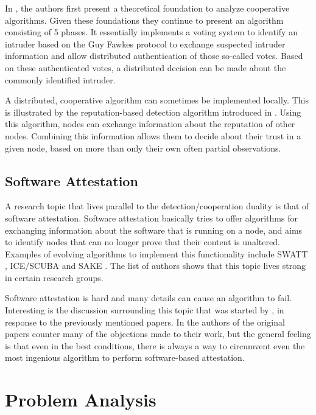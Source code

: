 \documentclass[conference]{IEEEtran}
\begin{document}
In \cite{krontiris2009cooperative}, the authors first present a theoretical
foundation to analyze cooperative algorithms. Given these foundations they
continue to present an algorithm consisting of 5 phases. It essentially
implements a voting system to identify an intruder based on the Guy Fawkes
protocol \cite{anderson1998new} to exchange suspected intruder information and
allow distributed authentication of those so-called votes. Based on these
authenticated votes, a distributed decision can be made about the commonly
identified intruder.

A distributed, cooperative algorithm can sometimes be implemented locally. This
is illustrated by the reputation-based detection algorithm introduced in
\cite{ganeriwal2008reputation}. Using this algorithm, nodes can exchange
information about the reputation of other nodes. Combining this information
allows them to decide about their trust in a given node, based on more than
only their own often partial observations.

\subsection{Software Attestation}
\label{subsection:attestation}

A research topic that lives parallel to the detection/cooperation duality is
that of software attestation. Software attestation basically tries to offer
algorithms for exchanging information about the software that is running on a
node, and aims to identify nodes that can no longer prove that their content is
unaltered. Examples of evolving algorithms to implement this functionality
include SWATT \cite{seshadri2004swatt}, ICE/SCUBA \cite{seshadri2006scuba} and
SAKE \cite{seshadri2008sake}. The list of authors shows that this topic lives
strong in certain research groups.

Software attestation is hard and many details can cause an algorithm to fail.
Interesting is the discussion surrounding this topic that was started by
\cite{castelluccia2009difficulty}, in response to the previously mentioned
papers. In \cite{perrig2010refutation} the authors of the original papers
counter many of the objections made to their work, but the general feeling is
that even in the best conditions, there is always a way to circumvent even the
most ingenious algorithm to perform software-based attestation.

\section{Problem Analysis}
\label{section:problem}
\end{document}

